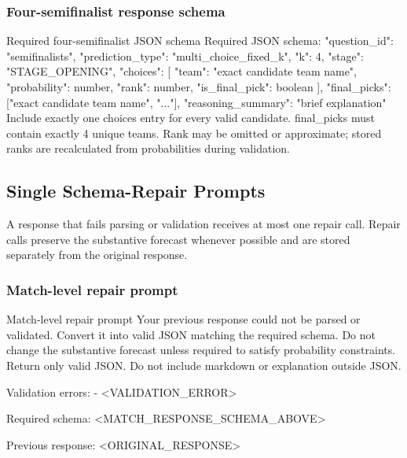 \documentclass[sigconf,nonacm]{acmart}
\newcommand{\promptheadingbreak}{\leavevmode\par\nopagebreak[4]}
\begin{document}
\subsubsection*{Four-semifinalist response schema}
\promptheadingbreak
\begin{promptbox}{Required four-semifinalist JSON schema}
Required JSON schema:
{
  "question_id": "semifinalists",
  "prediction_type": "multi_choice_fixed_k",
  "k": 4,
  "stage": "STAGE_OPENING",
  "choices": [
    {
      "team": "exact candidate team name",
      "probability": number,
      "rank": number,
      "is_final_pick": boolean
    }
  ],
  "final_picks": ["exact candidate team name", "..."],
  "reasoning_summary": "brief explanation"
}
Include exactly one choices entry for every valid candidate. final_picks must contain exactly 4 unique teams.
Rank may be omitted or approximate; stored ranks are recalculated from probabilities during validation.
\end{promptbox}

\subsection{Single Schema-Repair Prompts}

A response that fails parsing or validation receives at most one repair call. Repair calls preserve the substantive forecast whenever possible and are stored separately from the original response.

\subsubsection*{Match-level repair prompt}
\promptheadingbreak
\begin{promptbox}{Match-level repair prompt}
Your previous response could not be parsed or validated.
Convert it into valid JSON matching the required schema.
Do not change the substantive forecast unless required to satisfy probability constraints.
Return only valid JSON. Do not include markdown or explanation outside JSON.

Validation errors:
- <VALIDATION_ERROR>

Required schema:
<MATCH_RESPONSE_SCHEMA_ABOVE>

Previous response:
<ORIGINAL_RESPONSE>
\end{promptbox}
\end{document}
